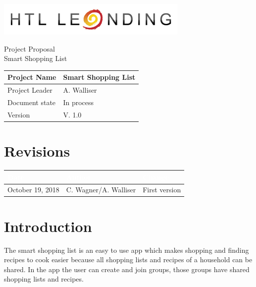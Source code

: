 \documentclass[12pt]{article}
\theoremstyle{definition}
\newcommand{\projectname}{Smart Shopping List}
\newcommand{\productname}{Smart Shopping List}
\newcommand{\projectleader}{A. Walliser}
\newcommand{\documentstatus}{In process}
\newcommand{\version}{V. 1.0}
\begin{document}
\begin{titlepage}
\begin{flushright}
\includegraphics[scale=.5]{htlleondinglogo.png}\\
\end{flushright}

\vspace{10em}

\begin{center}
{\Huge Project Proposal} \\[3em]
{\LARGE \productname} \\[3em]
\end{center}

\begin{flushleft}
\begin{tabular}{|l|l|}
\hline
Project Name & \projectname \\ \hline
Project Leader & \projectleader \\ \hline
Document state & \documentstatus \\ \hline
Version & \version \\ \hline
\end{tabular}
\end{flushleft}

\end{titlepage}
\section*{Revisions}
\begin{tabular}{|l|l|l|}
\hline
\cellcolor[gray]{0.5}\textcolor{white}{Date} & \cellcolor[gray]{0.5}\textcolor{white}{Author} & \cellcolor[gray]{0.5}\textcolor{white}{Change} \\ \hline
October 19, 2018&C. Wagner/A. Walliser&First version \\ \hline
\end{tabular}
\pagebreak

\tableofcontents
\pagebreak

\section{Introduction}

The smart shopping list is an easy to use app which makes shopping and finding recipes to cook easier because all shopping lists and recipes of a household can be shared. In the app the user can create and join groups, those groups have shared shopping lists and recipes.
\end{document}
